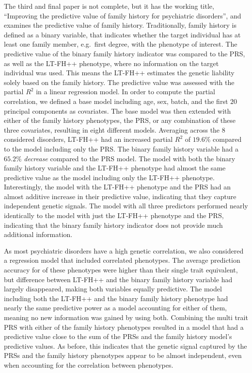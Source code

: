 The third and final paper is not complete, but it has the working title, \enquote{Improving the predictive value of family history for psychiatric disorders},  and examines the predictive value of family history. Traditionally, family history is defined as a binary variable, that indicates whether the target individual has at least one family member, e.g.\ first degree, with the phenotype of interest. The predictive value of the binary family history indicator was compared to the PRS, as well as the LT-FH++ phenotype, where no information on the target individual was used. This means the LT-FH++ estimates the genetic liability solely based on the family history. The predictive value was assessed with the partial $ R^2 $ in a linear regression model. In order to compute the partial correlation, we defined a base model including age, sex, batch, and the first $ 20 $ principal components as covariates. The base model was then extended with either of the family history phenotypes, the PRS, or any combination of these three covariates, resulting in eight different models. Averaging across the $ 8 $ considered disorders, LT-FH++ had an increased partial $ R^2 $ of $ 19.6\% $ compared to the model including only the PRS. The binary family history variable had a $ 65.2\% $ \textit{decrease} compared to the PRS model. The model with both the binary family history variable and the LT-FH++ phenotype had almost the same predictive value as the model including only the LT-FH++ phenotype. Interestingly, the model with the LT-FH++ phenotype and the PRS had an almost additive increase in their predictive value, indicating that they capture independent genetic signals. The model with all three predictors performed nearly identically to the model with just the LT-FH++ phenotype and the PRS, indicating that the binary family history indicator does not provide much additional information. 
 
As most psychiatric disorders have a high genetic correlation, we also considered a regression model that included correlated phenotypes. The average prediction accuracy for of these phenotypes were higher than their single trait equivalent, but difference between LT-FH++ and the binary family history variable had largely disappeared, making both variables equally predictive. The model including both the LT-FH++ and the binary family history phenotype had nearly the same predictive power as a model accounting for either of them, meaning no new information was gained by using both. Combining the multi trait PRS with either of the family history phenotypes resulted in a model that had a predictive value close to the sum of the PRSs and the family history model's predictive values. As before, this indicates that the genetic signal captured by the PRSs and the family history phenotypes appear to be almost independent, even when accounting for the correlation between phenotypes.


